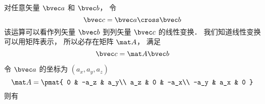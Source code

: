 
对任意矢量 $\bvec a$ 和 $\bvec b$， 令
\begin{equation}
\bvec c = \bvec a \cross \bvec b
\end{equation}
该运算可以看作列矢量 $\bvec b$ 到列矢量 $\bvec c$ 的线性变换． 我们知道线性变换可以用矩阵表示， 所以必存在矩阵 $\mat A$， 满足
\begin{equation}
\bvec c = \mat A \bvec b
\end{equation}

令 $\bvec a$ 的坐标为 $(a_x, a_y, a_z)$
\begin{equation}
\mat A = \pmat{
0 & -a_z & a_y\\
a_z & 0 & -a_x\\
-a_y & a_x & 0
}
\end{equation}
则有

